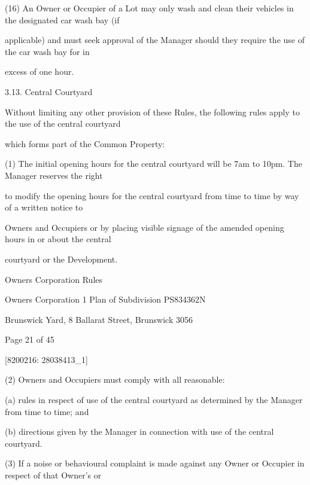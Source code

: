 \documentclass{article}
\begin{document}
{\fontsize{9.962}{1}(16) An Owner or Occupier of a Lot may only wash and clean their vehicles in the designated car wash bay (if }

{\fontsize{10.02}{1}applicable) and must seek approval of the Manager should they require the use of the car wash bay for in }

{\fontsize{10.02}{1}excess of one hour. }

{\fontsize{9.99}{1}3.13. Central Courtyard }

{\fontsize{10.02}{1}Without limiting any other provision of these Rules, the following rules apply to the use of the central courtyard }

{\fontsize{10.02}{1}which forms part of the Common Property: }

{\fontsize{9.962}{1}(1) The initial opening hours for the central courtyard will be 7am to 10pm. The Manager reserves the right }

{\fontsize{10.02}{1}to modify the opening hours for the central courtyard from time to time by way of a written notice to }

{\fontsize{10.02}{1}Owners and Occupiers or by placing visible signage of the amended opening hours in or about the central }

{\fontsize{10.02}{1}courtyard or the Development.  }

\newpage





{\fontsize{9}{1}Owners Corporation Rules }

{\fontsize{9}{1}Owners Corporation 1 Plan of Subdivision PS834362N }

{\fontsize{9}{1}Brunswick Yard, 8 Ballarat Street, Brunswick 3056 }


{\fontsize{9}{1}Page 21  of 45 }



{\fontsize{7.02}{1}[8200216: 28038413\_1] }

{\fontsize{9.962}{1}(2) Owners and Occupiers must comply with all reasonable: }

{\fontsize{9.962}{1}(a) rules in respect of use of the central courtyard as determined by the Manager from time to time; and }

{\fontsize{9.962}{1}(b) directions given by the Manager in connection with use of the central courtyard. }

{\fontsize{9.962}{1}(3) If a noise or behavioural complaint is made against any Owner or Occupier in respect of that Owner’s or }
\end{document}
